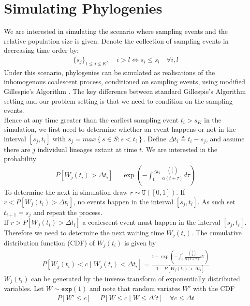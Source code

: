 \documentclass{report}
\theoremstyle{definition}
\begin{document}
\section{Simulating Phylogenies}
We are interested in simulating the scenario where sampling events and the relative population size is given. Denote the collection of sampling events in decreasing time order by:
\begin{gather}
\{s_j\}_{1\leq j\leq K}, \quad i>l \Leftrightarrow s_i \leq s_l\quad \forall i,l
\end{gather}
Under this scenario, phylogenies can be simulated as realisations of the inhomogenous coalescent process, conditioned on sampling events, using modified Gillespie's Algorithm \cite{erban_practical_nodate}. The key difference between standard Gillespie's Algorithm setting and our problem setting is that we need to condition on the sampling events.\\
Hence at any time greater than the earliest sampling event $t_i > s_K$ in the simulation, we first need to determine whether an event happens or not in the interval $[s_j, t_i]$ with $s_j = max\left\{s\in S : s<t_i\right\}$. Define $\Delta t_i \triangleq t_i-s_j$, and assume there are $j$ individual lineages extant at time $t$. We are interested in the probability
\begin{gather*}
  P[W_j(t_i) > \Delta t_i] = \exp(-\int_0^{\Delta t_i}\frac{\binom{j}{2}}{\alpha(t+\tau)}d\tau)
\end{gather*}
To determine the next in simulation draw $r \sim \texttt{U}([0,1])$. 
If $r < P[W_j(t_i) > \Delta t_i]$, no events happen in the interval $[s_j, t_i]$. As such set $t_{i+1} = s_j$ and repeat the process.\\
If $r > P[W_j(t_i) > \Delta t_i]$ a coalescent event must happen in the interval $[s_j, t_i]$. Therefore we need to determine the next waiting time $W_j(t_i)$. The cumulative distribution function (CDF) of $W_j(t_i)$ is given by
\begin{gather}
  P[W_j(t_i) < c \mid W_j(t_i) < \Delta t_i] =\frac{1-\exp(-\int_{0}^{c}{\frac{\binom{j}{2}}{\alpha(t+\tau)}d\tau})}{1-P[W_j(t_i) > \Delta t_i]}
\end{gather}
$W_j(t_i)$ can be generated by the inverse transform of exponentially distributed variables. Let $W \sim \texttt{exp}(1)$ and note that random variates $W'$ with the CDF
\begin{gather}
  P[W' \leq c] = P[W\leq c\mid W\leq\Delta' t] \quad\forall c \leq \Delta t
\end{gather}
\end{document}
